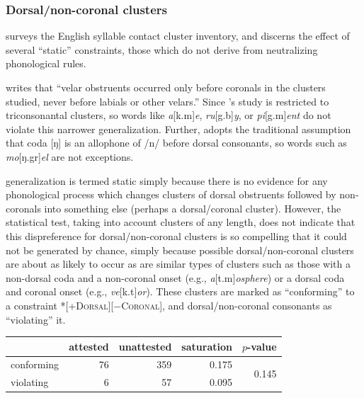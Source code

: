 \subsubsection{Dorsal/non-coronal clusters}

\citet{Pierrehumbert1994} surveys the English syllable contact cluster inventory, and discerns the effect of several ``static'' constraints, those which do not derive from neutralizing phonological rules. 

\citet[][173]{Pierrehumbert1994} writes that ``velar obstruents occurred only before coronals in the clusters studied, never before labials or other velars.'' Since \citeauthor{Pierrehumbert1994}'s study is restricted to triconsonantal clusters, so words like \emph{a}[k.m]\emph{e}, \emph{ru}[g.b]\emph{y}, or \emph{pi}[g.m]\emph{ent} do not violate this narrower generalization. Further, \citeauthor{Pierrehumbert1994} adopts the traditional assumption \citep[e.g.,][66f.]{Borowsky1986} that coda [ŋ] is an allophone of /n/ before dorsal consonants, so words such as \emph{mo}[ŋ.gr]\emph{el} are not exceptions. 

\citeauthor{Pierrehumbert1994} generalization is termed static simply because there is no evidence for any phonological process which changes clusters of dorsal obstruents followed by non-coronals into something else (perhaps a dorsal/coronal cluster). However, the statistical test, taking into account clusters of any length, does not indicate that this dispreference for dorsal/non-coronal clusters is so compelling that it could not be generated by chance, simply because possible dorsal/non-coronal clusters are about as likely to occur as are similar types of clusters such as those with a non-dorsal coda and a non-coronal onset (e.g., \emph{a}[t.m]\emph{osphere}) or a dorsal coda and coronal onset (e.g., \emph{ve}[k.t]\emph{or}). These clusters are marked as ``conforming'' to a constraint \textsc{*[+Dorsal][$-$Coronal]}, and dorsal/non-coronal consonants as ``violating'' it. 

\begin{example}
\begin{tabular}{l r r r r}
\toprule
           & attested & unattested & saturation & $p$-value \\
\midrule
conforming & 76 & 359 & 0.175 & \multirow{2}{*}{0.145} \\
violating  &  6 &  57 & 0.095 \\
\bottomrule
\end{tabular}
\end{example}

